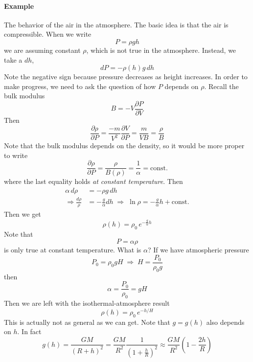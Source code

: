 \documentclass{report}
\numberwithin{equation}{section}
\newcommand{\pd}[2]{\frac{\partial #1}{\partial #2}}
\begin{document}
\paragraph{Example} The behavior of the air in the atmosphere. The basic idea is that the air is compressible. When we write
\begin{equation*}
    P = \rho g h
\end{equation*}
we are assuming constant $\rho$, which is not true in the atmosphere. Instead, we take a $dh$,
\begin{equation*}
    dP = -\rho(h) g\, dh
\end{equation*}
Note the negative sign because pressure decreases as height increases. In order to make progress, we need to ask the question of how $P$ depends on $\rho$. Recall the bulk modulus
\begin{equation*}
    B = -V\pd{P}{V}
\end{equation*}
Then
\begin{equation*}
    \pd{\rho}{P} = \frac{-m}{V^2}\pd{V}{P} = \frac{m}{VB} = \frac{\rho}{B}
\end{equation*}
Note that the bulk modulus depends on the density, so it would be more proper to write
\begin{equation*}
    \pd{\rho}{P} = \frac{\rho}{B(\rho)} = \frac{1}{\alpha} = \text{const.}
\end{equation*}
where the last equality holds \emph{at constant temperature}. Then
\begin{align*}
    \alpha\, d\rho &= -\rho g\, dh\\
    \Rightarrow \frac{d\rho}{\rho} &= -\frac{g}{\alpha}dh \;\Rightarrow\; \ln \rho = -\frac{g}{\alpha}h + \text{const.}
\end{align*}
Then we get
\begin{equation*}
    \rho(h) = \rho_0\, e^{-\frac{g}{\alpha}h}
\end{equation*}
Note that
\begin{equation*}
    P = \alpha \rho
\end{equation*}
is only true at constant temperature. What is $\alpha$? If we have atmospheric pressure
\begin{equation*}
    P_0 = \rho_0 g H \;\Rightarrow\; H = \frac{P_0}{\rho_0 g}
\end{equation*}
then
\begin{equation*}
    \alpha = \frac{P_0}{\rho_0} = gH
\end{equation*}
Then we are left with the isothermal-atmosphere result
\begin{equation}
    \rho(h) = \rho_0\, e^{-h/H}
\end{equation}
This is actually not as general as we can get. Note that $g = g(h)$ also depends on $h$. In fact
\begin{equation*}
    g(h) = \frac{GM}{(R+h)^2} = \frac{GM}{R^2}\frac{1}{\left(1+\frac{h}{R}\right)^2} \approx \frac{GM}{R^2}\left(1-\frac{2h}{R}\right)
\end{equation*}
\end{document}
